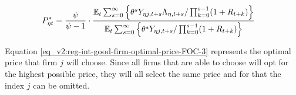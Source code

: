 \documentclass[../thesis.tex]{subfiles}
\begin{document}
\begin{comment}

Substitute \ref{eq_v2:reg-final-goods-firm-FOC} in \ref{eq_v2:reg-int-good-firm-optimal-price-FOC}:
\begin{alignat}{2}
	\E \sum_{s=0}^{\infty} \Bigg\{ \frac{\theta^s (\psi-1) Y_{\eta j,t+s}}{\prod_{k=0}^{s-1}(1+R_{t+k})} \Bigg\} &= \E \sum_{s=0}^{\infty} \Bigg\{ \frac{\theta^s \psi P_{\eta jt}^{-1} Y_{\eta j,t+s} \Lambda_{\eta, t+s}}{\prod_{k=0}^{s-1}(1+R_{t+k})}  \Bigg\} &\implies \nonumber \\
	(\psi-1) \E \sum_{s=0}^{\infty} \Bigg\{ \frac{\theta^s Y_{\eta j,t+s}}{\prod_{k=0}^{s-1}(1+R_{t+k})} \Bigg\} &= \psi P_{\eta jt}^{-1} \E \sum_{s=0}^{\infty} \Bigg\{ \frac{\theta^s Y_{\eta j,t+s} \Lambda_{\eta, t+s}}{\prod_{k=0}^{s-1}(1+R_{t+k})}  \Bigg\} &\implies \nonumber \\
	P_{\eta jt} \E \sum_{s=0}^{\infty} \Bigg\{ \frac{\theta^s Y_{\eta j,t+s}}{\prod_{k=0}^{s-1}(1+R_{t+k})} \Bigg\} &= \frac{\psi}{\psi-1} \E \sum_{s=0}^{\infty} \Bigg\{ \frac{\theta^s Y_{\eta j,t+s} \Lambda_{\eta, t+s}}{\prod_{k=0}^{s-1}(1+R_{t+k})}  \Bigg\} &\implies \nonumber
\end{alignat}

\vspace*{-1cm}

\begin{align}
	\label{eq_v2:reg-int-good-firm-optimal-price-FOC-2}
	P_{\eta jt}^{\ast} &= 
	\frac{\psi}{\psi-1} \cdot
	\frac{
		\E \sum_{s=0}^{\infty} \left\{ 
		\theta^s Y_{\eta j,t+s} \Lambda_{\eta, t+s} / \prod_{k=0}^{s-1}(1+R_{t+k}) \right\}} {\E \sum_{s=0}^{\infty} \left\{
		\theta^s Y_{\eta j,t+s} / \prod_{k=0}^{s-1}(1+R_{t+k}) \right\}}
\end{align}	
	
\end{comment}

\begin{align}
	P_{\eta t}^{\ast} &= \frac{\psi}{\psi-1} \cdot \frac{{\mathbb{E}_{t}} \sum_{s=0}^{\infty} \left\{ \theta^s Y_{\eta j,t+s} \Lambda_{\eta, t+s} / \prod_{k=0}^{s-1}(1+R_{t+k}) \right\}}{{\mathbb{E}_{t}} \sum_{s=0}^{\infty} \left\{ \theta^s Y_{\eta j,t+s} / \prod_{k=0}^{s-1}(1+R_{t+k}) \right\}} \label{eq_v2:reg-int-good-firm-optimal-price-FOC-3}
\end{align}

Equation \ref{eq_v2:reg-int-good-firm-optimal-price-FOC-3} represents the optimal price that firm $j$ will choose. Since all firms that are able to choose will opt for the highest possible price, they will all select the same price and for that the index $j$ can be omitted.
\end{document}
